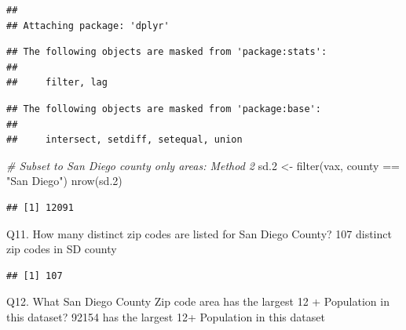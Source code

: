 \documentclass[
]{article}
\newenvironment{Shaded}{\begin{snugshade}}{\end{snugshade}}
\newcommand{\CommentTok}[1]{\textcolor[rgb]{0.56,0.35,0.01}{\textit{#1}}}
\newcommand{\FloatTok}[1]{\textcolor[rgb]{0.00,0.00,0.81}{#1}}
\newcommand{\FunctionTok}[1]{\textcolor[rgb]{0.00,0.00,0.00}{#1}}
\newcommand{\NormalTok}[1]{#1}
\newcommand{\OtherTok}[1]{\textcolor[rgb]{0.56,0.35,0.01}{#1}}
\newcommand{\SpecialCharTok}[1]{\textcolor[rgb]{0.00,0.00,0.00}{#1}}
\newcommand{\StringTok}[1]{\textcolor[rgb]{0.31,0.60,0.02}{#1}}
\begin{document}
\begin{verbatim}
## 
## Attaching package: 'dplyr'
\end{verbatim}

\begin{verbatim}
## The following objects are masked from 'package:stats':
## 
##     filter, lag
\end{verbatim}

\begin{verbatim}
## The following objects are masked from 'package:base':
## 
##     intersect, setdiff, setequal, union
\end{verbatim}

\begin{Shaded}
\begin{Highlighting}[]
\CommentTok{\# Subset to San Diego county only areas: Method 2}
\NormalTok{sd}\FloatTok{.2} \OtherTok{\textless{}{-}} \FunctionTok{filter}\NormalTok{(vax, county }\SpecialCharTok{==} \StringTok{"San Diego"}\NormalTok{)}
\FunctionTok{nrow}\NormalTok{(sd}\FloatTok{.2}\NormalTok{)}
\end{Highlighting}
\end{Shaded}

\begin{verbatim}
## [1] 12091
\end{verbatim}

Q11. How many distinct zip codes are listed for San Diego County? 107
distinct zip codes in SD county

\begin{Shaded}
\end{Shaded}

\begin{verbatim}
## [1] 107
\end{verbatim}

Q12. What San Diego County Zip code area has the largest 12 + Population
in this dataset? 92154 has the largest 12+ Population in this dataset

\begin{Shaded}
\end{Shaded}
\end{document}
